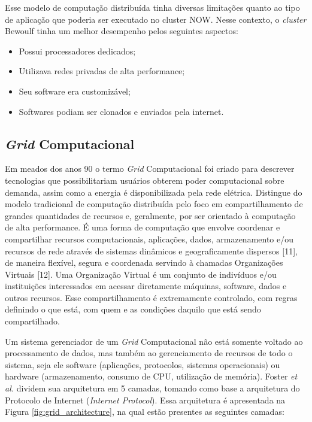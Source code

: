 Esse modelo de computação distribuída tinha diversas limitações quanto ao tipo de aplicação que poderia ser executado no cluster NOW. Nesse contexto, o \textit{cluster} Bewoulf tinha um melhor desempenho pelos seguintes aspectos: 

\begin{itemize}
    \item Possui processadores dedicados;
    \item Utilizava redes privadas de alta performance;
    \item Seu software era customizável;
    \item Softwares podiam ser clonados e enviados pela internet.
\end{itemize}

\subsection{\textit{Grid} Computacional} \label{cap2sec1subsec2}

Em meados dos anos 90 o termo \textit{Grid} Computacional foi criado para descrever tecnologias que possibilitariam usuários obterem poder computacional sobre demanda, assim como a energia é disponibilizada pela rede elétrica. Distingue do modelo tradicional de computação distribuída pelo foco em compartilhamento de grandes quantidades de recursos e, geralmente, por ser orientado à computação de alta performance. É uma forma de computação que envolve coordenar e compartilhar recursos computacionais, aplicações, dados, armazenamento e/ou recursos de rede através de sistemas dinâmicos e geograficamente dispersos [11], de maneira flexível, segura e coordenada servindo à chamadas Organizações Virtuais [12]. Uma Organização Virtual é um conjunto de indivíduos e/ou instituições interessados em acessar diretamente máquinas, software, dados e outros recursos. Esse compartilhamento é extremamente controlado, com regras definindo o que está, com quem e as condições daquilo que está sendo compartilhado.

Um sistema gerenciador de um \textit{Grid} Computacional não está somente voltado ao processamento de dados, mas também ao gerenciamento de recursos de todo o sistema, seja ele software (aplicações, protocolos, sistemas operacionais) ou hardware (armazenamento, consumo de CPU, utilização de memória). Foster \textit{et al.} \cite{cloud_360} dividem sua arquitetura em 5 camadas, tomando como base a arquitetura do Protocolo de Internet (\textit{Internet Protocol}). Essa arquitetura é apresentada na Figura \ref{fig:grid_architecture}, na qual estão presentes as seguintes camadas: 

